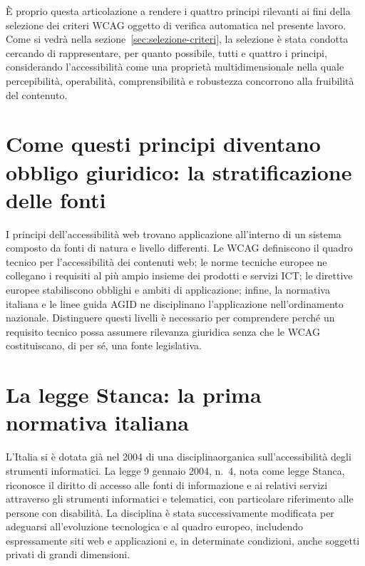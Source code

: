 È proprio questa articolazione a rendere i quattro principi rilevanti ai fini della selezione dei criteri WCAG oggetto di verifica automatica nel presente lavoro. Come si vedrà nella sezione~\ref{sec:selezione-criteri}, la selezione è stata condotta cercando di rappresentare, per quanto possibile, tutti e quattro i principi, considerando l'accessibilità come una proprietà multidimensionale nella quale percepibilità, operabilità, comprensibilità e robustezza concorrono alla fruibilità del contenuto.

\section{Come questi principi diventano obbligo giuridico: la stratificazione delle fonti}

\label{sec:stratificazione-fonti}

I principi dell'accessibilità web trovano applicazione all'interno di un sistema composto da fonti di natura e livello differenti. Le WCAG definiscono il quadro tecnico per l'accessibilità dei contenuti web; le norme tecniche europee ne collegano i requisiti al più ampio insieme dei prodotti e servizi ICT; le direttive europee stabiliscono obblighi e ambiti di applicazione; infine, la normativa italiana e le linee guida AGID ne disciplinano l'applicazione nell'ordinamento nazionale. Distinguere questi livelli è necessario per comprendere perché un requisito tecnico possa assumere rilevanza giuridica senza che le WCAG costituiscano, di per sé, una fonte legislativa.

\section{La legge Stanca: la prima normativa italiana}

L'Italia si è dotata già nel 2004 di una \gls{disciplinaorganica} sull'accessibilità degli strumenti informatici. La legge 9 gennaio 2004, n.~4, nota come legge Stanca, riconosce il diritto di accesso alle fonti di informazione e ai relativi servizi attraverso gli strumenti informatici e telematici, con particolare riferimento alle persone con disabilità. La disciplina è stata successivamente modificata per adeguarsi all'evoluzione tecnologica e al quadro europeo, includendo espressamente siti web e applicazioni  e, in determinate condizioni, anche soggetti privati di grandi dimensioni.


